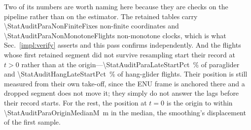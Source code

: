 \begin{revblock}
Two of its numbers are worth naming here because they are checks on the pipeline rather
than on the estimator. The retained tables carry
\num{\StatAuditParaNonFiniteFixes} non-finite coordinates and
\num{\StatAuditParaNonMonotoneFlights} non-monotone clocks, which is what
Sec.~\ref{impl:verify} asserts and this pass confirms independently. And the flights whose
first retained segment did not survive resampling start their record at $t>0$ rather than
at the origin---\SI{\StatAuditParaLateStartPct}{\percent} of paraglider and
\SI{\StatAuditHangLateStartPct}{\percent} of hang-glider flights. Their position is still
measured from their own take-off, since the ENU frame is anchored there and a dropped
segment does not move it; they simply do not answer the lags before their record starts.
For the rest, the position at $t=0$ is the origin to within
\SI{\StatAuditParaOriginMedianM}{\metre} in the median, the smoothing's displacement of
the first sample.
\end{revblock}

